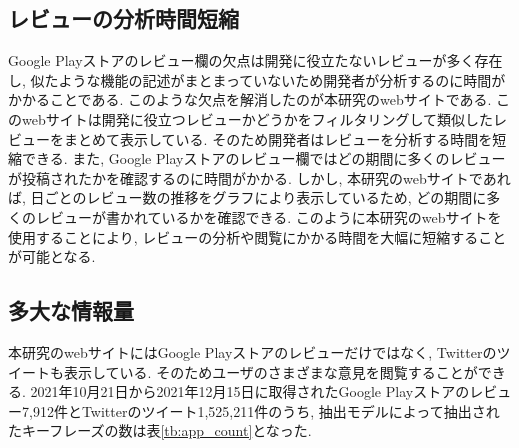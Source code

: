 



\subsection{レビューの分析時間短縮}
Google Playストアのレビュー欄の欠点は開発に役立たないレビューが多く存在し, 似たような機能の記述がまとまっていないため開発者が分析するのに時間がかかることである. 
このような欠点を解消したのが本研究のwebサイトである. このwebサイトは開発に役立つレビューかどうかをフィルタリングして類似したレビューをまとめて表示している. そのため開発者はレビューを分析する時間を短縮できる. 
また, Google Playストアのレビュー欄ではどの期間に多くのレビューが投稿されたかを確認するのに時間がかかる. しかし, 本研究のwebサイトであれば, 日ごとのレビュー数の推移をグラフにより表示しているため, どの期間に多くのレビューが書かれているかを確認できる. 
このように本研究のwebサイトを使用することにより, レビューの分析や閲覧にかかる時間を大幅に短縮することが可能となる. 

\subsection{多大な情報量}
本研究のwebサイトにはGoogle Playストアのレビューだけではなく, Twitterのツイートも表示している. そのためユーザのさまざまな意見を閲覧することができる. 
2021年10月21日から2021年12月15日に取得されたGoogle Playストアのレビュー7,912件とTwitterのツイート1,525,211件のうち, 抽出モデルによって抽出されたキーフレーズの数は表\ref{tb:app_count}となった. 

